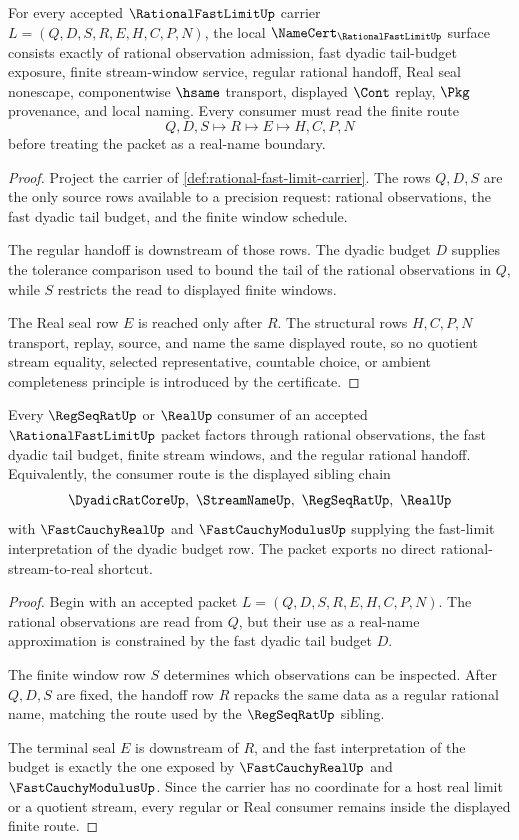 \begin{theorem}\label{thm:rational-fast-limit-namecert-obligations}
For every accepted $\RationalFastLimitUp$ carrier $L=(Q,D,S,R,E,H,C,P,N)$, the local $\NameCert_{\RationalFastLimitUp}$ surface consists exactly of rational observation admission, fast dyadic tail-budget exposure, finite stream-window service, regular rational handoff, Real seal nonescape, componentwise $\hsame$ transport, displayed $\Cont$ replay, $\Pkg$ provenance, and local naming. Every consumer must read the finite route
$$
Q,D,S \longmapsto R \longmapsto E \longmapsto H,C,P,N
$$
before treating the packet as a real-name boundary.
\end{theorem}
\begin{proof}
Project the carrier of \autoref{def:rational-fast-limit-carrier}. The rows $Q,D,S$ are the only source rows available to a precision request: rational observations, the fast dyadic tail budget, and the finite window schedule.

The regular handoff is downstream of those rows. The dyadic budget $D$ supplies the tolerance comparison used to bound the tail of the rational observations in $Q$, while $S$ restricts the read to displayed finite windows.

The Real seal row $E$ is reached only after $R$. The structural rows $H,C,P,N$ transport, replay, source, and name the same displayed route, so no quotient stream equality, selected representative, countable choice, or ambient completeness principle is introduced by the certificate.
\end{proof}

\begin{theorem}\label{thm:rational-fast-limit-regular-readback}
Every $\RegSeqRatUp$ or $\RealUp$ consumer of an accepted $\RationalFastLimitUp$ packet factors through rational observations, the fast dyadic tail budget, finite stream windows, and the regular rational handoff. Equivalently, the consumer route is the displayed sibling chain
$$
\DyadicRatCoreUp,\ \StreamNameUp,\ \RegSeqRatUp,\ \RealUp
$$
with $\FastCauchyRealUp$ and $\FastCauchyModulusUp$ supplying the fast-limit interpretation of the dyadic budget row. The packet exports no direct rational-stream-to-real shortcut.
\end{theorem}
\begin{proof}
Begin with an accepted packet $L=(Q,D,S,R,E,H,C,P,N)$. The rational observations are read from $Q$, but their use as a real-name approximation is constrained by the fast dyadic tail budget $D$.

The finite window row $S$ determines which observations can be inspected. After $Q,D,S$ are fixed, the handoff row $R$ repacks the same data as a regular rational name, matching the route used by the $\RegSeqRatUp$ sibling.

The terminal seal $E$ is downstream of $R$, and the fast interpretation of the budget is exactly the one exposed by $\FastCauchyRealUp$ and $\FastCauchyModulusUp$. Since the carrier has no coordinate for a host real limit or a quotient stream, every regular or Real consumer remains inside the displayed finite route.
\end{proof}

